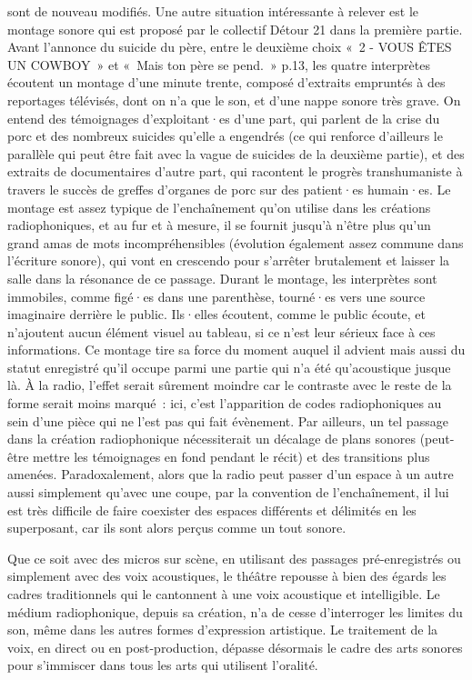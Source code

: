 \documentclass[
]{article}
\begin{document}
sont de nouveau modifiés. Une autre situation intéressante à relever est le montage sonore qui est proposé par le collectif Détour 21 dans la première partie. Avant l'annonce du suicide du père, entre le deuxième choix «~2 - VOUS ÊTES UN COWBOY~» et «~Mais ton père se pend.~» p.13, les quatre interprètes écoutent un montage d'une minute trente, composé d'extraits empruntés à des reportages télévisés, dont on n'a que le son, et d'une nappe sonore très grave. On entend des témoignages d'exploitant·es d'une part, qui parlent de la crise du porc et des nombreux suicides qu'elle a engendrés (ce qui renforce d'ailleurs le parallèle qui peut être fait avec la vague de suicides de la deuxième partie), et des extraits de documentaires d'autre part, qui racontent le progrès transhumaniste à travers le succès de greffes d'organes de porc sur des patient·es humain·es. Le montage est assez typique de l'enchaînement qu'on utilise dans les créations radiophoniques, et au fur et à mesure, il se fournit jusqu'à n'être plus qu'un grand amas de mots incompréhensibles (évolution également assez commune dans l'écriture sonore), qui vont en crescendo pour s'arrêter brutalement et laisser la salle dans la résonance de ce passage. Durant le montage, les interprètes sont immobiles, comme figé·es dans une parenthèse, tourné·es vers une source imaginaire derrière le public. Ils·elles écoutent, comme le public écoute, et n'ajoutent aucun élément visuel au tableau, si ce n'est leur sérieux face à ces informations. Ce montage tire sa force du moment auquel il advient mais aussi du statut enregistré qu'il occupe parmi une partie qui n'a été qu'acoustique jusque là. À la radio, l'effet serait sûrement moindre car le contraste avec le reste de la forme serait moins marqué~: ici, c'est l'apparition de codes radiophoniques au sein d'une pièce qui ne l'est pas qui fait évènement. Par ailleurs, un tel passage dans la création radiophonique nécessiterait un décalage de plans sonores (peut-être mettre les témoignages en fond pendant le récit) et des transitions plus amenées. Paradoxalement, alors que la radio peut passer d'un espace à un autre aussi simplement qu'avec une coupe, par la convention de l'enchaînement, il lui est très difficile de faire coexister des espaces différents et délimités en les superposant, car ils sont alors perçus comme un tout sonore.

Que ce soit avec des micros sur scène, en utilisant des passages pré-enregistrés ou simplement avec des voix acoustiques, le théâtre repousse à bien des égards les cadres traditionnels qui le cantonnent à une voix acoustique et intelligible. Le médium radiophonique, depuis sa création, n'a de cesse d'interroger les limites du son, même dans les autres formes d'expression artistique. Le traitement de la voix, en direct ou en post-production, dépasse désormais le cadre des arts sonores pour s'immiscer dans tous les arts qui utilisent l'oralité.
\end{document}
